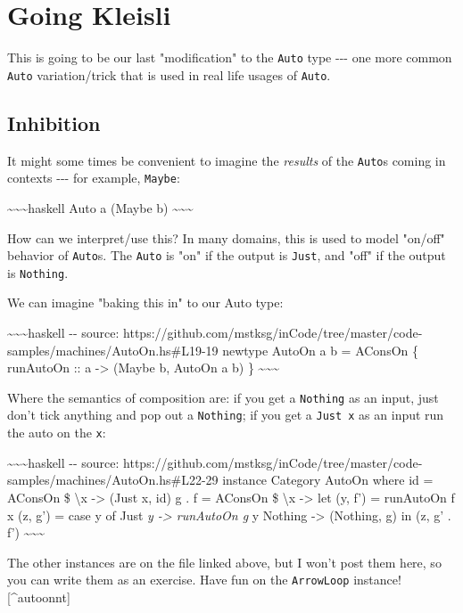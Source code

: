 \documentclass[]{article}
\begin{document}
\section{Going Kleisli}

This is going to be our last "modification" to the \texttt{Auto} type -\/-\/-
one more common \texttt{Auto} variation/trick that is used in real life usages
of \texttt{Auto}.

\subsection{Inhibition}

It might some times be convenient to imagine the \emph{results} of the
\texttt{Auto}s coming in contexts -\/-\/- for example, \texttt{Maybe}:

\textasciitilde{}\textasciitilde{}\textasciitilde{}haskell Auto a (Maybe b)
\textasciitilde{}\textasciitilde{}\textasciitilde{}

How can we interpret/use this? In many domains, this is used to model "on/off"
behavior of \texttt{Auto}s. The \texttt{Auto} is "on" if the output is
\texttt{Just}, and "off" if the output is \texttt{Nothing}.

We can imagine "baking this in" to our Auto type:

\textasciitilde{}\textasciitilde{}\textasciitilde{}haskell -\/- source:
https://github.com/mstksg/inCode/tree/master/code-samples/machines/AutoOn.hs\#L19-19
newtype AutoOn a b = AConsOn \{ runAutoOn :: a -\textgreater{} (Maybe b, AutoOn
a b) \} \textasciitilde{}\textasciitilde{}\textasciitilde{}

Where the semantics of composition are: if you get a \texttt{Nothing} as an
input, just don't tick anything and pop out a \texttt{Nothing}; if you get a
\texttt{Just\ x} as an input run the auto on the \texttt{x}:

\textasciitilde{}\textasciitilde{}\textasciitilde{}haskell -\/- source:
https://github.com/mstksg/inCode/tree/master/code-samples/machines/AutoOn.hs\#L22-29
instance Category AutoOn where id = AConsOn \$ \textbackslash{}x -\textgreater{}
(Just x, id) g . f = AConsOn \$ \textbackslash{}x -\textgreater{} let (y, f') =
runAutoOn f x (z, g') = case y of Just \emph{y -\textgreater{} runAutoOn g }y
Nothing -\textgreater{} (Nothing, g) in (z, g' . f')
\textasciitilde{}\textasciitilde{}\textasciitilde{}

The other instances are on the file linked above, but I won't post them here, so
you can write them as an exercise. Have fun on the \texttt{ArrowLoop}
instance!{[}\^{}autoonnt{]}
\end{document}
